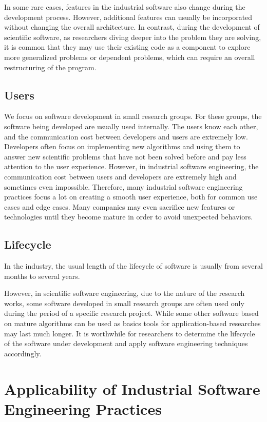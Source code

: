 In some rare cases, features in the industrial software also change during the development process.
However, additional features can usually be incorporated without changing the overall architecture.
In contrast, during the development of scientific software, as researchers diving deeper into the problem they are solving, it is common that they may use their existing code as a component to explore more generalized problems or dependent problems, which can require an overall restructuring of the program.

\subsection{Users}
We focus on software development in small research groups.
For these groups, the software being developed are usually used internally.
The users know each other, and the communication cost between developers and users are extremely low.
Developers often focus on implementing new algorithms and using them to answer new scientific problems that have not been solved before and pay less attention to the user experience.
However, in industrial software engineering, the communication cost between users and developers are extremely high and sometimes even impossible.
Therefore, many industrial software engineering practices focus a lot on creating a smooth user experience, both for common use cases and edge cases.
Many companies may even sacrifice new features or technologies until they become mature in order to avoid unexpected behaviors.

\subsection{Lifecycle}

In the industry, the usual length of the lifecycle of software is usually from several months to several years.

However, in scientific software engineering, due to the nature of the research works, some software developed in small research groups are often used only during the period of a specific research project.
While some other software based on mature algorithms can be used as basics tools for application-based researches may last much longer.
It is worthwhile for researchers to determine the lifecycle of the software under development and apply software engineering techniques accordingly.

\section{Applicability of Industrial Software Engineering Practices}

